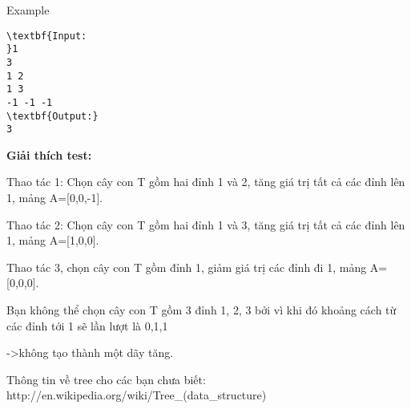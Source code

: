 Example
\begin{verbatim}
\textbf{Input:
}1
3
1 2
1 3
-1 -1 -1
\textbf{Output:}
3
\end{verbatim}

\textbf{Giải thích test:}

Thao tác 1: Chọn cây con T gồm hai đỉnh 1 và 2, tăng giá trị tất cả các đỉnh lên 1, mảng A=[0,0,-1].

Thao tác 2: Chọn cây con T gồm hai đỉnh 1 và 3, tăng giá trị tất cả các đỉnh lên 1, mảng A=[1,0,0].

Thao tác 3, chọn cây con T gồm đỉnh 1, giảm giá trị các đỉnh đi 1, mảng A=[0,0,0].

Bạn không thể chọn cây con T gồm 3 đỉnh 1, 2, 3 bởi vì khi đó khoảng cách từ các đỉnh tới 1 sẽ lần lượt là 0,1,1

->không tạo thành một dãy tăng.

Thông tin về tree cho các bạn chưa biết: http://en.wikipedia.org/wiki/Tree\_(data\_structure)
